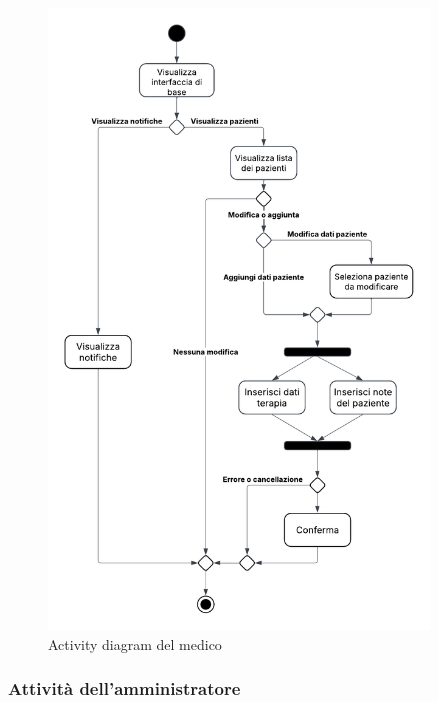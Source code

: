 \documentclass[a4paper]{article}
\begin{document}
\begin{figure}[H]
  \begin{center}
    \includegraphics[width=0.9\textwidth]{adMedico}
  \end{center}
  \caption{Activity diagram del medico}
  \label{fig:adMedico}
\end{figure}

\subsubsection{Attività dell'amministratore}
\end{document}
